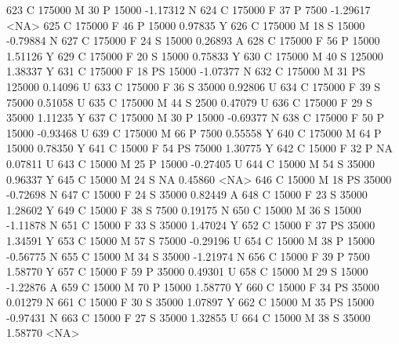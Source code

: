 \documentclass{article}
\begin{document}
\begin{Schunk}
\begin{Soutput}
623       C     175000   M  30         P  15000  -1.17312    N
624       C     175000   F  37         P   7500  -1.29617 <NA>
625       C     175000   F  46         P  15000   0.97835    Y
626       C     175000   M  18         S  15000  -0.79884    N
627       C     175000   F  24         S  15000   0.26893    A
628       C     175000   F  56         P  15000   1.51126    Y
629       C     175000   F  20         S  15000   0.75833    Y
630       C     175000   M  40         S 125000   1.38337    Y
631       C     175000   F  18        PS  15000  -1.07377    N
632       C     175000   M  31        PS 125000   0.14096    U
633       C     175000   F  36         S  35000   0.92806    U
634       C     175000   F  39         S  75000   0.51058    U
635       C     175000   M  44         S   2500   0.47079    U
636       C     175000   F  29         S  35000   1.11235    Y
637       C     175000   M  30         P  15000  -0.69377    N
638       C     175000   F  50         P  15000  -0.93468    U
639       C     175000   M  66         P   7500   0.55558    Y
640       C     175000   M  64         P  15000   0.78350    Y
641       C      15000   F  54        PS  75000   1.30775    Y
642       C      15000   F  32         P     NA   0.07811    U
643       C      15000   M  25         P  15000  -0.27405    U
644       C      15000   M  54         S  35000   0.96337    Y
645       C      15000   M  24         S     NA   0.45860 <NA>
646       C      15000   M  18        PS  35000  -0.72698    N
647       C      15000   F  24         S  35000   0.82449    A
648       C      15000   F  23         S  35000   1.28602    Y
649       C      15000   F  38         S   7500   0.19175    N
650       C      15000   M  36         S  15000  -1.11878    N
651       C      15000   F  33         S  35000   1.47024    Y
652       C      15000   F  37        PS  35000   1.34591    Y
653       C      15000   M  57         S  75000  -0.29196    U
654       C      15000   M  38         P  15000  -0.56775    N
655       C      15000   M  34         S  35000  -1.21974    N
656       C      15000   F  39         P   7500   1.58770    Y
657       C      15000   F  59         P  35000   0.49301    U
658       C      15000   M  29         S  15000  -1.22876    A
659       C      15000   M  70         P  15000   1.58770    Y
660       C      15000   F  34        PS  35000   0.01279    N
661       C      15000   F  30         S  35000   1.07897    Y
662       C      15000   M  35        PS  15000  -0.97431    N
663       C      15000   F  27         S  35000   1.32855    U
664       C      15000   M  38         S  35000   1.58770 <NA>

\end{Soutput}
\end{Schunk}
\end{document}
